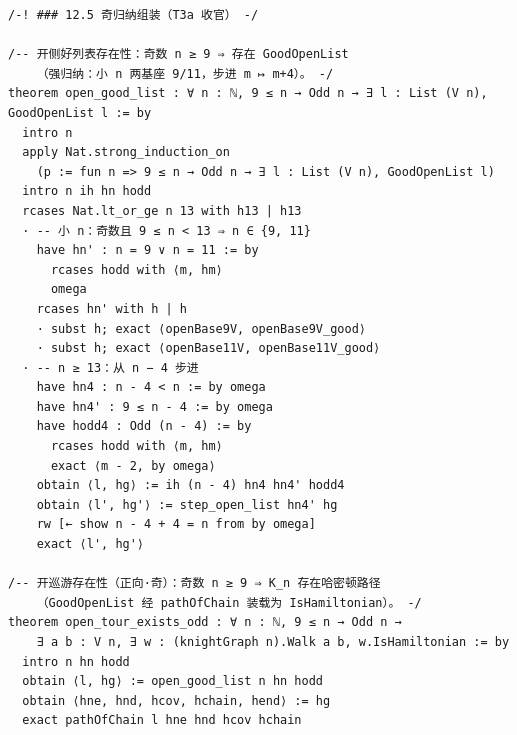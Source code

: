 \documentclass[11pt]{article}
\begin{document}
\begin{lstlisting}[caption={Verbatim lines 2001--2036: the open-tour
induction assembly for odd $n\ge 9$ (bases $9/11$, step $n\mapsto n+4$).},label={lst:proof-open}]
/-! ### 12.5 奇归纳组装（T3a 收官） -/

/-- 开侧好列表存在性：奇数 n ≥ 9 ⇒ 存在 GoodOpenList
    （强归纳：小 n 两基座 9/11，步进 m ↦ m+4）。 -/
theorem open_good_list : ∀ n : ℕ, 9 ≤ n → Odd n → ∃ l : List (V n), GoodOpenList l := by
  intro n
  apply Nat.strong_induction_on
    (p := fun n => 9 ≤ n → Odd n → ∃ l : List (V n), GoodOpenList l)
  intro n ih hn hodd
  rcases Nat.lt_or_ge n 13 with h13 | h13
  · -- 小 n：奇数且 9 ≤ n < 13 ⇒ n ∈ {9, 11}
    have hn' : n = 9 ∨ n = 11 := by
      rcases hodd with ⟨m, hm⟩
      omega
    rcases hn' with h | h
    · subst h; exact ⟨openBase9V, openBase9V_good⟩
    · subst h; exact ⟨openBase11V, openBase11V_good⟩
  · -- n ≥ 13：从 n − 4 步进
    have hn4 : n - 4 < n := by omega
    have hn4' : 9 ≤ n - 4 := by omega
    have hodd4 : Odd (n - 4) := by
      rcases hodd with ⟨m, hm⟩
      exact ⟨m - 2, by omega⟩
    obtain ⟨l, hg⟩ := ih (n - 4) hn4 hn4' hodd4
    obtain ⟨l', hg'⟩ := step_open_list hn4' hg
    rw [← show n - 4 + 4 = n from by omega]
    exact ⟨l', hg'⟩

/-- 开巡游存在性（正向·奇）：奇数 n ≥ 9 ⇒ K_n 存在哈密顿路径
    （GoodOpenList 经 pathOfChain 装载为 IsHamiltonian）。 -/
theorem open_tour_exists_odd : ∀ n : ℕ, 9 ≤ n → Odd n →
    ∃ a b : V n, ∃ w : (knightGraph n).Walk a b, w.IsHamiltonian := by
  intro n hn hodd
  obtain ⟨l, hg⟩ := open_good_list n hn hodd
  obtain ⟨hne, hnd, hcov, hchain, hend⟩ := hg
  exact pathOfChain l hne hnd hcov hchain
\end{lstlisting}
\end{document}
